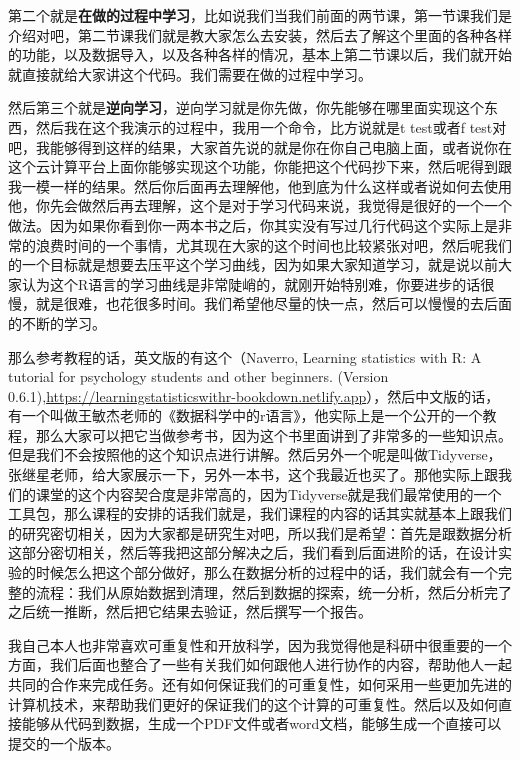 \documentclass[
  oneside]{book}
\begin{document}
第二个就是\textbf{在做的过程中学习}，比如说我们当我们前面的两节课，第一节课我们是介绍对吧，第二节课我们就是教大家怎么去安装，然后去了解这个里面的各种各样的功能，以及数据导入，以及各种各样的情况，基本上第二节课以后，我们就开始就直接就给大家讲这个代码。我们需要在做的过程中学习。

然后第三个就是\textbf{逆向学习}，逆向学习就是你先做，你先能够在哪里面实现这个东西，然后我在这个我演示的过程中，我用一个命令，比方说就是t test或者f test对吧，我能够得到这样的结果，大家首先说的就是你在你自己电脑上面，或者说你在这个云计算平台上面你能够实现这个功能，你能把这个代码抄下来，然后呢得到跟我一模一样的结果。然后你后面再去理解他，他到底为什么这样或者说如何去使用他，你先会做然后再去理解，这个是对于学习代码来说，我觉得是很好的一个一个做法。因为如果你看到你一两本书之后，你其实没有写过几行代码这个实际上是非常的浪费时间的一个事情，尤其现在大家的这个时间也比较紧张对吧，然后呢我们的一个目标就是想要去压平这个学习曲线，因为如果大家知道学习，就是说以前大家认为这个R语言的学习曲线是非常陡峭的，就刚开始特别难，你要进步的话很慢，就是很难，也花很多时间。我们希望他尽量的快一点，然后可以慢慢的去后面的不断的学习。

那么参考教程的话，英文版的有这个（Naverro, Learning statistics with R: A tutorial for psychology students and other beginners. (Version 0.6.1),\url{https://learningstatisticswithr-bookdown.netlify.app}），然后中文版的话，有一个叫做王敏杰老师的《数据科学中的r语言》，他实际上是一个公开的一个教程，那么大家可以把它当做参考书，因为这个书里面讲到了非常多的一些知识点。但是我们不会按照他的这个知识点进行讲解。然后另外一个呢是叫做Tidyverse，张继星老师，给大家展示一下，另外一本书，这个我最近也买了。那他实际上跟我们的课堂的这个内容契合度是非常高的，因为Tidyverse就是我们最常使用的一个工具包，那么课程的安排的话我们就是，我们课程的内容的话其实就基本上跟我们的研究密切相关，因为大家都是研究生对吧，所以我们是希望：首先是跟数据分析这部分密切相关，然后等我把这部分解决之后，我们看到后面进阶的话，在设计实验的时候怎么把这个部分做好，那么在数据分析的过程中的话，我们就会有一个完整的流程：我们从原始数据到清理，然后到数据的探索，统一分析，然后分析完了之后统一推断，然后把它结果去验证，然后撰写一个报告。

我自己本人也非常喜欢可重复性和开放科学，因为我觉得他是科研中很重要的一个方面，我们后面也整合了一些有关我们如何跟他人进行协作的内容，帮助他人一起共同的合作来完成任务。还有如何保证我们的可重复性，如何采用一些更加先进的计算机技术，来帮助我们更好的保证我们的这个计算的可重复性。然后以及如何直接能够从代码到数据，生成一个PDF文件或者word文档，能够生成一个直接可以提交的一个版本。
\end{document}

